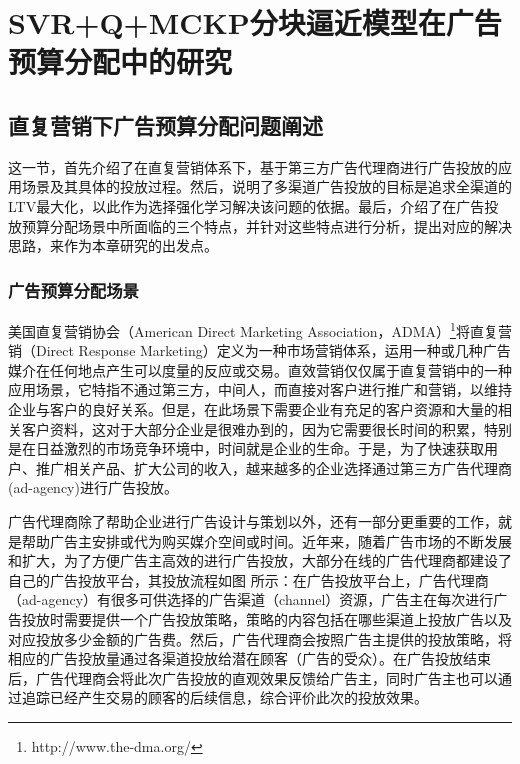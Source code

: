 

\chapter{SVR+Q+MCKP分块逼近模型在广告预算分配中的研究}


\section{直复营销下广告预算分配问题阐述}
这一节，首先介绍了在直复营销体系下，基于第三方广告代理商进行广告投放的应用场景及其具体的投放过程。然后，说明了多渠道广告投放的目标是追求全渠道的LTV最大化，以此作为选择强化学习解决该问题的依据。最后，介绍了在广告投放预算分配场景中所面临的三个特点，并针对这些特点进行分析，提出对应的解决思路，来作为本章研究的出发点。

\subsection{广告预算分配场景}
美国直复营销协会（American Direct Marketing Association，ADMA）\footnote{http://www.the-dma.org/}将直复营销（Direct Response Marketing）定义为一种市场营销体系，运用一种或几种广告媒介在任何地点产生可以度量的反应或交易。直效营销仅仅属于直复营销中的一种应用场景，它特指不通过第三方，中间人，而直接对客户进行推广和营销，以维持企业与客户的良好关系。但是，在此场景下需要企业有充足的客户资源和大量的相关客户资料，这对于大部分企业是很难办到的，因为它需要很长时间的积累，特别是在日益激烈的市场竞争环境中，时间就是企业的生命。于是，为了快速获取用户、推广相关产品、扩大公司的收入，越来越多的企业选择通过第三方广告代理商(ad-agency)进行广告投放。

广告代理商除了帮助企业进行广告设计与策划以外，还有一部分更重要的工作，就是帮助广告主安排或代为购买媒介空间或时间。近年来，随着广告市场的不断发展和扩大，为了方便广告主高效的进行广告投放，大部分在线的广告代理商都建设了自己的广告投放平台，其投放流程如图
所示：在广告投放平台上，广告代理商（ad-agency）有很多可供选择的广告渠道（channel）资源，广告主在每次进行广告投放时需要提供一个广告投放策略，策略的内容包括在哪些渠道上投放广告以及对应投放多少金额的广告费。然后，广告代理商会按照广告主提供的投放策略，将相应的广告投放量通过各渠道投放给潜在顾客（广告的受众）。在广告投放结束后，广告代理商会将此次广告投放的直观效果反馈给广告主，同时广告主也可以通过追踪已经产生交易的顾客的后续信息，综合评价此次的投放效果。



